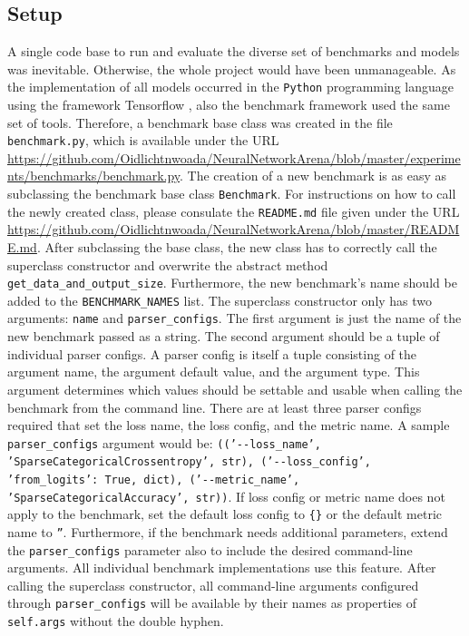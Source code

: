 \documentclass[draft,final]{vutinfth} %
\begin{document}
    \subsection{Setup}
    A single code base to run and evaluate the diverse set of benchmarks and models was inevitable.
    Otherwise, the whole project would have been unmanageable.
    As the implementation of all models occurred in the \texttt{Python} programming language \cite{Python3} using the framework Tensorflow \cite{Tensorflow}, also the benchmark framework used the same set of tools.
    Therefore, a benchmark base class was created in the file \texttt{benchmark.py}, which is available under the URL \url{https://github.com/Oidlichtnwoada/NeuralNetworkArena/blob/master/experiments/benchmarks/benchmark.py}.
    The creation of a new benchmark is as easy as subclassing the benchmark base class \texttt{Benchmark}.
    For instructions on how to call the newly created class, please consulate the \texttt{README.md} file given under the URL \url{https://github.com/Oidlichtnwoada/NeuralNetworkArena/blob/master/README.md}.
    After subclassing the base class, the new class has to correctly call the superclass constructor and overwrite the abstract method \texttt{get\_data\_and\_output\_size}.
    Furthermore, the new benchmark's name should be added to the \texttt{BENCHMARK\_NAMES} list.
    The superclass constructor only has two arguments: \texttt{name} and \texttt{parser\_configs}.
    The first argument is just the name of the new benchmark passed as a string.
    The second argument should be a tuple of individual parser configs.
    A parser config is itself a tuple consisting of the argument name, the argument default value, and the argument type.
    This argument determines which values should be settable and usable when calling the benchmark from the command line.
    There are at least three parser configs required that set the loss name, the loss config, and the metric name.
    A sample \texttt{parser\_configs} argument would be: \texttt{(('-{}-loss\_name', 'SparseCategoricalCrossentropy', str), ('-{}-loss\_config', {'from\_logits': True}, dict), ('-{}-metric\_name', 'SparseCategoricalAccuracy', str))}.
    If loss config or metric name does not apply to the benchmark, set the default loss config to \texttt{\{\}} or the default metric name to \texttt{''}.
    Furthermore, if the benchmark needs additional parameters, extend the \texttt{parser\_configs} parameter also to include the desired command-line arguments.
    All individual benchmark implementations use this feature.
    After calling the superclass constructor, all command-line arguments configured through \texttt{parser\_configs} will be available by their names as properties of \texttt{self.args} without the double hyphen.
\end{document}
